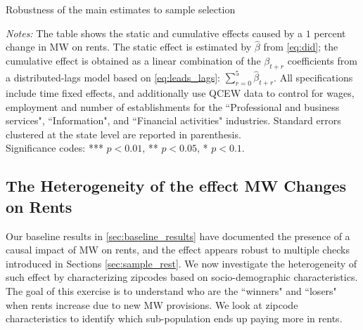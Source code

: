 \begin{table}[h!]\centering
	\caption{Robustness of the main estimates to sample selection}  %
	\label{tab:wgt_unbal_comparison}
	
	\begin{minipage}{0.95\textwidth}\footnotesize
	\vspace{3mm}	
	\textit{Notes:} The table shows the static and cumulative effects caused by a $1$ percent
	change in MW on rents. The static effect is estimated by $\hat{\beta}$ from \autoref{eq:did};
	the cumulative effect is obtained as a linear combination of the $\beta_{t+r}$ coefficients from 
	a distributed-lags model based on \autoref{eq:leads_lags}: 
	$\sum\limits_{r = 0}^5 \hat{\beta}_{t+r}$. All specifications include time fixed effects, 
	and additionally use QCEW data to control for wages, employment and number of establishments 
	for the ``Professional and business services", ``Information", and ``Financial activities" industries.
	Standard errors clustered at the state level are
	reported in parenthesis. \\
	Significance codes: *** $p < 0.01$, ** $p < 0.05$, * $p < 0.1$. 	
	\end{minipage}
\end{table}



\subsection{The Heterogeneity of the effect MW Changes on Rents}\label{sec:heter}

Our baseline results in \autoref{sec:baseline_results} have documented the presence of a causal 
impact of MW on rents, and the effect appears robust to multiple checks introduced in Sections 
\ref{sec:sample_rest}. We now investigate the heterogeneity of such effect 
by characterizing zipcodes based on socio-demographic characteristics. The goal of this exercise is 
to understand who are the ``winners" and ``losers" when rents increase 
due to new MW provisions. We look at zipcode characteristics to identify which sub-population ends 
up paying more in rents.

